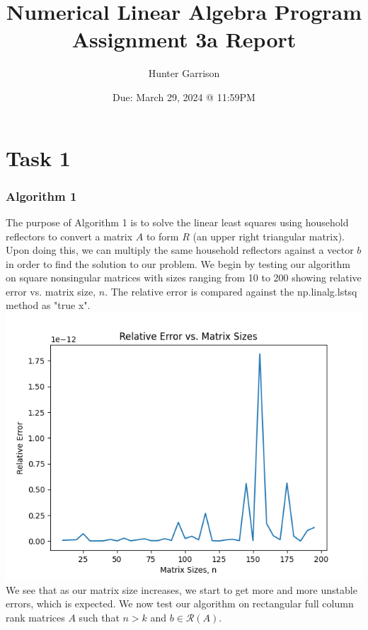 \documentclass{article}
\title{Numerical Linear Algebra Program Assignment 3a Report}
\author{Hunter Garrison}
\date{Due: March 29, 2024 @ 11:59PM}
\begin{document}
\maketitle  %

\section*{Task 1}
\subsubsection*{Algorithm 1}
The purpose of Algorithm 1 is to solve the linear least squares using household reflectors to convert a matrix $A$ to form $R$ 
(an upper right triangular matrix). Upon doing this, we can multiply the same household reflectors against a vector $b$ in order to find
the solution to our problem.\newline\newline
We begin by testing our algorithm on square nonsingular matrices with sizes ranging from 10 to 200 showing relative error vs. 
matrix size, $n$. The relative error is compared against the np.linalg.lstsq method as "true x".\newline
\includegraphics[width=\linewidth]{Images/Figure_1.png}\newline
We see that as our matrix size increases, we start to get more and more unstable errors, which is expected.\newline\newline
We now test our algorithm on rectangular full column rank matrices $A$ such that $n > k$ and $b\in\mathcal{R}(A)$.\newline
\end{document}
